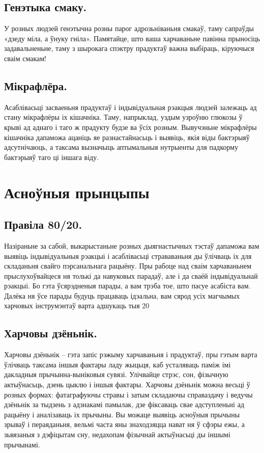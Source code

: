 \subsection{Генэтыка смаку.}
У розных людзей генэтычна розны парог адрозьніваньня смакаў, таму сапраўды «дзеду міла, а ўнуку гніла». Памятайце, што ваша харчаваньне павінна прыносіць задавальненьне, таму з шырокага спэктру прадуктаў важна выбіраць, кіруючыся сваім смакам!

\subsection{Мікрафлёра.}
Асаблівасьці засваеньня прадуктаў і індывідуальная рэакцыя людзей залежаць ад стану мікрафлёры іх кішачніка. Таму, напрыклад, уздым узроўню глюкозы ў крыві ад аднаго і таго ж прадукту будзе ва ўсіх розным. Вывучэньне мікрафлёры кішачніка дапаможа ацаніць яе разнастайнасьць і выявіць, якія віды бактэрыяў адсутнічаюць, а таксама вызначыць аптымальныя нутрыенты для падкорму бактэрыяў таго ці іншага віду.

\section{Асноўныя прынцыпы}

\subsection{Правіла 80/20.}
Назіраньне за сабой, выкарыстаньне розных дыягнастычных тэстаў дапаможа вам выявіць індывідуальныя рэакцыі і асаблівасьці страваваньня ды ўлічваць іх для складаньня свайго пэрсанальнага рацыёну. Пры рабоце над сваім харчаваньнем прыслухоўвайцеся ня толькі да навуковых парадаў, але і да сваёй індывідуальнай рэакцыі. Бо гэта ўсярэдненыя парады, а вам трэба тое, што пасуе асабіста вам. Далёка ня ўсе парады будуць працаваць ідэальна, вам сярод усіх магчымых харчовых інструмэнтаў варта адшукаць тыя 20%

\subsection{Харчовы дзёньнік.}
Харчовы дзёньнік – гэта запіс рэжыму харчаваньня і прадуктаў, пры гэтым варта ўлічваць таксама іншыя фактары ладу жыцьця, каб усталяваць паміж імі дакладныя прычынна-выніковыя сувязі. Улічвайце стрэс, сон, фізычную актыўнасьць, дзень цыклю і іншыя фактары. Харчовы дзёньнік можна весьці ў розных формах: фатаграфуючы стравы і затым складаючы справаздачу і ведучы дзёньнік за тыдзень з адзнакамі памылак, дзе фіксаваць свае адступленьні ад рацыёну і аналізаваць іх прычыны. Вы можаце выявіць асноўныя прычыны зрываў і пераяданьня, вельмі часта яны знаходзяцца нават ня ў сфэры ежы, а зьвязаныя з дэфіцытам сну, недахопам фізычнай актыўнасьці ды іншымі прычынамі.

